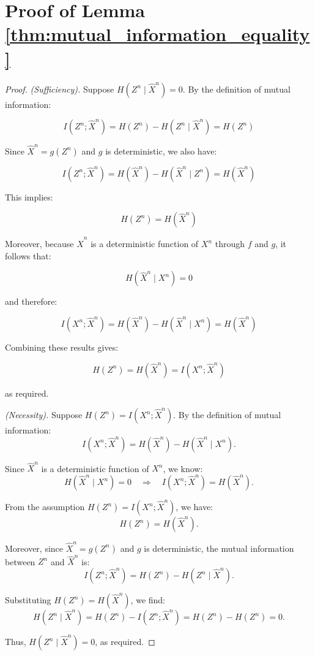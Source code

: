 \documentclass[12pt,review,authoryear]{elsarticle}
\theoremstyle{upright}
\begin{document}
\section{Proof of Lemma \ref{thm:mutual_information_equality}}
\label{Proof of Lemma 1}
\begin{proof}


\emph{(Sufficiency).} Suppose $H\left(Z^n \mid \hat{X}^n\right)=0$. By the definition of mutual information:

$$
I\left(Z^n ; \hat{X}^n\right)=H\left(Z^n\right)-H\left(Z^n \mid \hat{X}^n\right)=H\left(Z^n\right)
$$


Since $\hat{X}^n=g\left(Z^n\right)$ and $g$ is deterministic, we also have:

$$
I\left(Z^n ; \hat{X}^n\right)=H\left(\hat{X}^n\right)-H\left(\hat{X}^n \mid Z^n\right)=H\left(\hat{X}^n\right)
$$


This implies:

$$
H\left(Z^n\right)=H\left(\hat{X}^n\right)
$$


Moreover, because $\hat{X}^n$ is a deterministic function of $X^n$ through $f$ and $g$, it follows that:

$$
H\left(\hat{X}^n \mid X^n\right)=0
$$

and therefore:

$$
I\left(X^n ; \hat{X}^n\right)=H\left(\hat{X}^n\right)-H\left(\hat{X}^n \mid X^n\right)=H\left(\hat{X}^n\right)
$$


Combining these results gives:

$$
H\left(Z^n\right)=H\left(\hat{X}^n\right)=I\left(X^n ; \hat{X}^n\right)
$$

as required.

\emph{(Necessity).} Suppose $H(Z^n) = I(X^n; \hat{X}^n)$. By the definition of mutual information:
\[
I(X^n; \hat{X}^n) = H(\hat{X}^n) - H(\hat{X}^n \mid X^n).
\]

Since $\hat{X}^n$ is a deterministic function of $X^n$, we know:
\[
H(\hat{X}^n \mid X^n) = 0 \quad \Longrightarrow \quad I(X^n; \hat{X}^n) = H(\hat{X}^n).
\]

From the assumption $H(Z^n) = I(X^n; \hat{X}^n)$, we have:
\[
H(Z^n) = H(\hat{X}^n).
\]

Moreover, since $\hat{X}^n = g(Z^n)$ and $g$ is deterministic, the mutual information between $Z^n$ and $\hat{X}^n$ is:
\[
I(Z^n; \hat{X}^n) = H(Z^n) - H(Z^n \mid \hat{X}^n).
\]

Substituting $H(Z^n) = H(\hat{X}^n)$, we find:
\[
H(Z^n \mid \hat{X}^n) = H(Z^n) - I(Z^n; \hat{X}^n) = H(Z^n) - H(Z^n) = 0.
\]

Thus, $H(Z^n \mid \hat{X}^n) = 0$, as required.
\end{proof}
\end{document}

